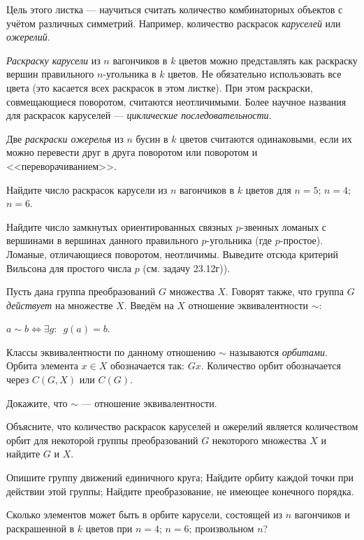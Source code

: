 \documentclass[a4paper,12pt]{article}
\begin{document}

{\footnotesize Цель этого листка --- научиться считать количество комбинаторных объектов с учётом различных симметрий.
Например, количество раскрасок {\it каруселей} или {\it ожерелий}.

{\it Раскраску карусели} из $n$ вагончиков в $k$ цветов
можно представлять как раскраску вершин правильного $n$-угольника в $k$ цветов. Не обязательно использовать все цвета (это касается всех раскрасок в этом листке).  При этом раскраски, совмещающиеся поворотом, считаются неотличимыми. Более научное названия для раскрасок каруселей --- {\it циклические последовательности}.

Две {\it раскраски ожерелья} из $n$ бусин в $k$ цветов считаются одинаковыми, если их можно перевести друг в друга поворотом или поворотом и <<переворачиванием>>.
\par}

 Найдите число раскрасок карусели из $n$ вагончиков в $k$ цветов для  $n=5$;  $n=4$;  $n=6$.

 Найдите число замкнутых ориентированных связных $p$-звенных ломаных с вершинами в вершинах данного правильного $p$-угольника (где $p$-простое). Ломаные, отличающиеся поворотом, неотличимы. Выведите отсюда критерий Вильсона для простого числа  $p$ (см. задачу 23.12г)).

 Пусть дана группа преобразований $G$ множества $X$. Говорят также, что группа $G$ {\it действует} на множестве $X$. Введём на $X$ отношение эквивалентности $\sim$:

$a \sim b \Leftrightarrow \exists g: \,\,\, g(a)=b$.

Классы эквивалентности по данному отношению $\sim$ называются {\it орбитами}. Орбита элемента $x \in X$ обозначается так: $Gx$.
Количество орбит обозначается через $C(G,X)$ или $C(G)$.

 Докажите, что $\sim$ --- отношение эквивалентности.

\label{GX} Объясните, что количество раскрасок каруселей и ожерелий является количеством орбит для некоторой группы преобразований $G$ некоторого множества $X$ и найдите $G$ и $X$.

Опишите группу движений единичного круга;
Найдите орбиту каждой точки при действии этой группы;
Найдите преобразование, не имеющее конечного порядка.

 Сколько элементов может быть в орбите карусели, состоящей из $n$ вагончиков и раскрашенной в $k$ цветов при  $n=4$; $n=6$;  произвольном $n$?
\end{document}
